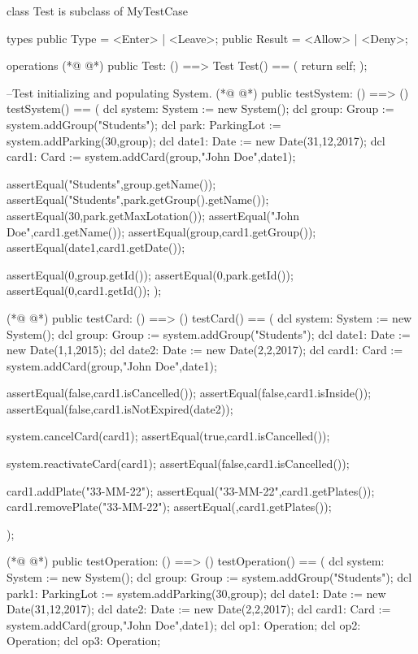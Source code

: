 \begin{vdmpp}[breaklines=true]
class Test is subclass of MyTestCase

types
public Type = <Enter> | <Leave>;
public Result = <Allow> | <Deny>;

operations
(*@
\label{Test:8}
@*)
public Test: () ==> Test
 Test() == (
  return self;
  );
  
--Test initializing and populating System.
(*@
\label{testSystem:14}
@*)
public testSystem: () ==> ()
 testSystem() == (
  dcl system: System := new System();
  dcl group: Group := system.addGroup("Students");
  dcl park: ParkingLot := system.addParking(30,group);
  dcl date1: Date := new Date(31,12,2017);
  dcl card1: Card := system.addCard(group,"John Doe",date1);
  
  assertEqual("Students",group.getName());
  assertEqual("Students",park.getGroup().getName());
  assertEqual(30,park.getMaxLotation());
  assertEqual("John Doe",card1.getName());
  assertEqual(group,card1.getGroup());
  assertEqual(date1,card1.getDate());
  
  assertEqual(0,group.getId());
  assertEqual(0,park.getId());
  assertEqual(0,card1.getId());
 );
 
(*@
\label{testCard:34}
@*)
public testCard: () ==> ()
 testCard() == (
  dcl system: System := new System();
  dcl group: Group := system.addGroup("Students");
  dcl date1: Date := new Date(1,1,2015);
  dcl date2: Date := new Date(2,2,2017);
  dcl card1: Card := system.addCard(group,"John Doe",date1);
  
  assertEqual(false,card1.isCancelled());
  assertEqual(false,card1.isInside());
  assertEqual(false,card1.isNotExpired(date2));
  
  
  system.cancelCard(card1);
  assertEqual(true,card1.isCancelled());
  
  system.reactivateCard(card1);
  assertEqual(false,card1.isCancelled());
  
  card1.addPlate("33-MM-22");
  assertEqual({"33-MM-22"},card1.getPlates());
  card1.removePlate("33-MM-22");
  assertEqual({},card1.getPlates());
  
 );
 
 
(*@
\label{testOperation:61}
@*)
public testOperation: () ==> ()
 testOperation() == (
  dcl system: System := new System();
  dcl group: Group := system.addGroup("Students");
  dcl park1: ParkingLot := system.addParking(30,group);
  dcl date1: Date := new Date(31,12,2017);
  dcl date2: Date := new Date(2,2,2017);
  dcl card1: Card := system.addCard(group,"John Doe",date1);
  dcl op1: Operation;
  dcl op2: Operation;
  dcl op3: Operation;
  

\end{vdmpp}
